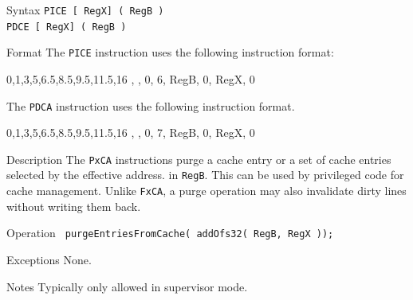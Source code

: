 %
%
\pagebreak
{}

\begin{iPageDescEntry}{Syntax}
    \texttt{PICE [ RegX] ( RegB )} \\
    \texttt{PDCE [ RegX] ( RegB )}
\end{iPageDescEntry}

\begin{iPageDescEntry}{Format}
    The \texttt{PICE} instruction uses the following instruction format: \\

    \begin{flushleft}
    \drawInstrFormat
        {0,1,3,5,6.5,8.5,9.5,11.5,16}
        {\OpCodeGrpSYS, \OpCodePCA, 0, 6, RegB, 0, RegX, 0}
    \end{flushleft}
    
    The \texttt{PDCA} instruction uses the following instruction format. \\

    \begin{flushleft}
    \drawInstrFormat
        {0,1,3,5,6.5,8.5,9.5,11.5,16}
        {\OpCodeGrpSYS, \OpCodePCA, 0, 7, RegB, 0, RegX, 0}
    \end{flushleft}
\end{iPageDescEntry}

\begin{iPageDescEntry}{Description}
    The \texttt{PxCA} instructions purge a cache entry or a set of cache entries selected by the effective address.
    in \texttt{RegB}. This can be used by privileged code for cache management. Unlike \texttt{FxCA}, a purge operation may also invalidate dirty lines without writing them back.
   
\end{iPageDescEntry}

\begin{iPageDescEntry}{Operation}
    \texttt{ purgeEntriesFromCache( addOfs32( RegB, RegX ));}
\end{iPageDescEntry}

\begin{iPageDescEntry}{Exceptions}
    None.
\end{iPageDescEntry}

\begin{iPageDescEntry}{Notes}
    Typically only allowed in supervisor mode.
\end{iPageDescEntry}
